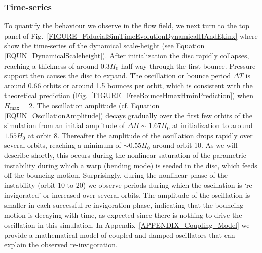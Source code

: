 \documentclass[fleqn,usenatbib]{mnras}
\begin{document}
\subsubsection{Time-series}
\label{RESULTS_FiducialSimulationTimeSeries}
To quantify the behaviour we observe in the flow field, we next turn to the top panel of Fig.~\ref{FIGURE_FiducialSimTimeEvolutionDynamicalHAndEkinx} where show the time-series of the dynamical scale-height (see Equation \ref{EQUN_DynamicalScaleheight}). After initialization the disc rapidly collapses, reaching a thickness of around $0.3H_0$ half-way through the first bounce. Pressure support then causes the disc to expand. The oscillation or bounce period $\Delta T$ is around 0.66 orbits or around 1.5 bounces per orbit, which is consistent with the theoretical prediction (Fig.~\ref{FIGURE_FreeBounceHmaxHminPrediction}) when $H_\text{max} = 2$. The oscillation amplitude (cf. Equation \ref{EQUN_OscillationAmplitude}) decays gradually over the first few orbits of the simulation from an initial amplitude of $\Delta H \sim 1.67H_0$ at initialization to around $1.55 H_0$ at orbit 8. Thereafter the amplitude of the oscillation drops rapidly over several orbits, reaching a minimum of $\sim 0.55 H_0$ around orbit 10. As we will describe shortly, this occurs during the nonlinear saturation of the parametric instability during which a warp (bending mode) is seeded in the disc, which feeds off the bouncing motion. Surprisingly, during the nonlinear phase of the instability (orbit 10 to 20) we observe periods during which the oscillation is `re-invigorated' or increased over several orbits. The amplitude of the oscillation is smaller in each successful re-invigoration phase, indicating that the bouncing motion is decaying with time, as expected since there is nothing to drive the oscillation in this simulation. In Appendix~\ref{APPENDIX_Coupling_Model} we provide a mathematical model of coupled and damped oscillators that can explain the observed re-invigoration.
\end{document}
